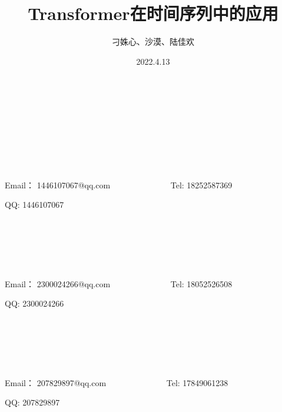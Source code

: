 \documentclass[10pt,t,handout]{beamer}
\title{Transformer在时间序列中的应用}
\author{刁姝心、沙漠、陆佳欢}
\institute{数学科学学院  }
\date{2022.4.13}
\begin{document}
{

\begin{frame}
    \titlepage
\end{frame}
}		
\begin{frame}
	
	\
	
	\
	
	{ }
	
	\

	{ }
	
	\
	
	Email： 1446107067@qq.com~~~~~~~~~~~~~~	Tel: 18252587369
	\
	
	QQ: 1446107067~~~~~~~~~~~~~~~~~~~~~~~~~~~~~~ 
	
	\
	
	\
	
	
	{ }
	
	\
	
	Email： 2300024266@qq.com~~~~~~~~~~~~~~	Tel: 18052526508
		\
	
	QQ: 2300024266~~~~~~~~~~~~~~~~~~~~~~~~~~~~~~ 
	
\

\

	{ }

\

Email： 207829897@qq.com~~~~~~~~~~~~~~	Tel: 17849061238
\

QQ: 207829897~~~~~~~~~~~~~~~~~~~~~~~~~~~~~~ 

\

\

\end{frame}
\end{document}
